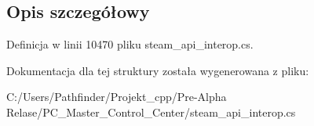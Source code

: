 \subsection{Opis szczegółowy}


Definicja w linii 10470 pliku steam\+\_\+api\+\_\+interop.\+cs.



Dokumentacja dla tej struktury została wygenerowana z pliku\+:\begin{DoxyCompactItemize}
\item 
C\+:/\+Users/\+Pathfinder/\+Projekt\+\_\+cpp/\+Pre-\/\+Alpha Relase/\+P\+C\+\_\+\+Master\+\_\+\+Control\+\_\+\+Center/steam\+\_\+api\+\_\+interop.\+cs\end{DoxyCompactItemize}
